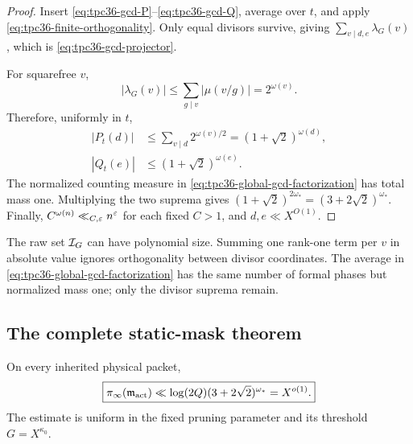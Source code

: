 \begin{proof}
Insert \eqref{eq:tpc36-gcd-P}--\eqref{eq:tpc36-gcd-Q}, average over
\(t\), and apply \eqref{eq:tpc36-finite-orthogonality}.  Only equal
divisors survive, giving \(\sum_{v\mid d,e}\lambda_G(v)\), which is
\eqref{eq:tpc36-gcd-projector}.

For squarefree \(v\),
\begin{equation}
 |\lambda_G(v)|
 \le\sum_{g\mid v}|\mu(v/g)|
 =2^{\omega(v)}.
 \label{eq:tpc36-lambda-bound}
\end{equation}
Therefore, uniformly in \(t\),
\begin{align}
 |P_t(d)|
 &\le\sum_{v\mid d}2^{\omega(v)/2}
 =(1+\sqrt2)^{\omega(d)},
 \label{eq:tpc36-P-bound}\\
 |Q_t(e)|
 &\le(1+\sqrt2)^{\omega(e)}.
 \label{eq:tpc36-Q-bound}
\end{align}
The normalized counting measure in
\eqref{eq:tpc36-global-gcd-factorization} has total mass one.  Multiplying
the two suprema gives
\((1+\sqrt2)^{2\omega_*}=(3+2\sqrt2)^{\omega_*}\).
Finally, \(C^{\omega(n)}\ll_{C,\varepsilon}n^\varepsilon\) for each fixed \(C>1\),
and \(d,e\ll X^{O(1)}\).
\end{proof}

\begin{remark}
The raw set \(\mathcal I_G\) can have polynomial size.  Summing one rank-one
term per \(v\) in absolute value ignores orthogonality between divisor
coordinates.  The average in
\eqref{eq:tpc36-global-gcd-factorization} has the same number of formal
phases but normalized mass one; only the divisor suprema remain.
\end{remark}

\subsection{The complete static-mask theorem}

\begin{theorem}
\label{thm:tpc36-global-static-mask}
On every inherited physical packet,
\begin{equation}
 \boxed{
 \pi_{\infty}(\mathfrak m_{\rm act})
 \ll\log(2Q)(3+2\sqrt2)^{\omega_*}
 =X^{o(1)}.}
 \label{eq:tpc36-global-static-mask-bound}
\end{equation}
The estimate is uniform in the fixed pruning parameter and its threshold
\(G=X^{\kappa_0}\).
\end{theorem}

